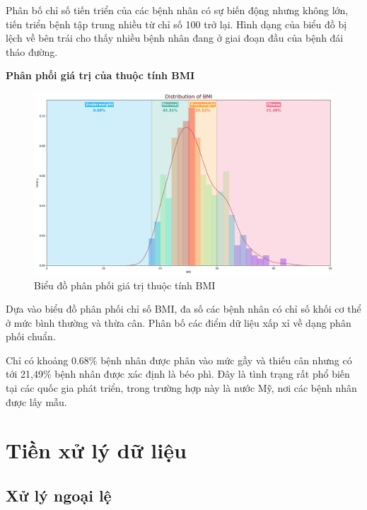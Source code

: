 \documentclass[runningheads]{llncs}
\begin{document}
Phân bố chỉ số tiến triển của các bệnh nhân có sự biến động nhưng không lớn, tiến triển bệnh tập trung nhiều từ chỉ số 100 trở lại. Hình dạng của biểu đồ bị lệch về bên trái cho thấy nhiều bệnh nhân đang ở giai đoạn đầu của bệnh đái tháo đường.


\vspace{0.5cm}
\textbf{Phân phối giá trị của thuộc tính BMI}

\begin{figure}[H]
\centering
\includegraphics[width=\textwidth]{Dist_BMI}
\caption{Biểu đồ phân phối giá trị thuộc tính BMI} \label{fig2}
\end{figure}

Dựa vào biểu đồ phân phối chỉ số BMI, đa số các bệnh nhân có chỉ số khối cơ thể ở mức bình thường và thừa cân. Phân bố các điểm dữ liệu xấp xỉ về dạng phân phối chuẩn.

Chỉ có khoảng 0.68\% bệnh nhân được phân vào mức gầy và thiếu cân nhưng có tới 21,49\% bệnh nhân được xác định là béo phì. Đây là tình trạng rất phổ biến tại các quốc gia phát triển, trong trường hợp này là nước Mỹ, nơi các bệnh nhân được lấy mẫu.


\pagebreak
\section{Tiền xử lý dữ liệu}
\subsection{Xử lý ngoại lệ}
\end{document}
